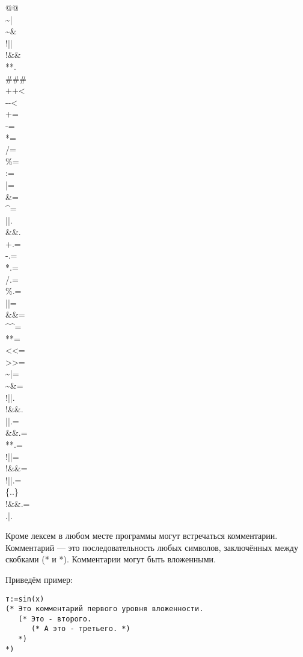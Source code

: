 \documentclass[10pt]{report}
\begin{document}
\begin{center}
\begin{multicols}{10}
@@\\
\~{ }|\\
\~{ }\&\\
!||\\
!\&\&\\
**.\\
\#\#\#\\
+{}+<\\
-{}-<\\
+=\\
-=\\
*=\\
/=\\
\%=\\
:=\\
|=\\
\&=\\
\^{ }=\\
||.\\
\&\&.\\
+.=\\
-.=\\
*.=\\
/.=\\
\%.=\\
||=\\
\&\&=\\
\^{ }\^{ }=\\
**=\\
<{}<=\\
>{}>=\\
\~{ }|=\\
\~{ }\&=\\
!||.\\
!\&\&.\\
||.=\\
\&\&.=\\
**.=\\
!||=\\
!\&\&=\\
!||.=\\
\{..\}\\
!\&\&.=\\
.|.


\end{multicols}
\end{center}

Кроме лексем в любом месте программы могут встречаться комментарии. Комментарий --- это последовательность любых символов, заключённых между скобками (* и *). Комментарии
могут быть вложенными.


Приведём пример:
\begin{verbatim}
т:=sin(x)
(* Это комментарий первого уровня вложенности.
   (* Это - второго.
      (* А это - третьего. *)
   *)
*)
\end{verbatim}
\end{document}
